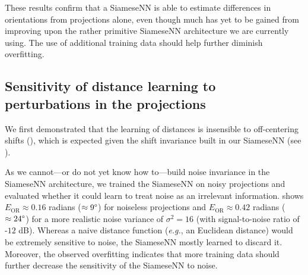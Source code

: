 These results confirm that a SiameseNN is able to estimate differences in orientations from projections alone, even though much has yet to be gained from improving upon the rather primitive SiameseNN architecture we are currently using.
The use of additional training data should help further diminish overfitting.


\subsection{Sensitivity of distance learning to perturbations in the projections}\label{sec:results:distance-estimation:sensitivity}


We first demonstrated that the learning of distances is insensible to off-centering shifts (), which is expected given the shift invariance built in our SiameseNN (see ).

As we cannot---or do not yet know how to---build noise invariance in the SiameseNN architecture, we trained the SiameseNN on noisy projections and evaluated whether it could learn to treat noise as an irrelevant information.
 shows $E_\text{OR} \approx 0.16$ radians ($\approx 9\degree$) for noiseless projections and $E_\text{OR} \approx 0.42$ radians ($\approx 24\degree$) for a more realistic noise variance of $\sigma^2=16$ (with signal-to-noise ratio of -$12$ dB).
Whereas a naive distance function (\textit{e.g.}, an Euclidean distance) would be extremely sensitive to noise, the SiameseNN mostly learned to discard it.
Moreover, the observed overfitting indicates that more training data should further decrease the sensitivity of the SiameseNN to noise.

